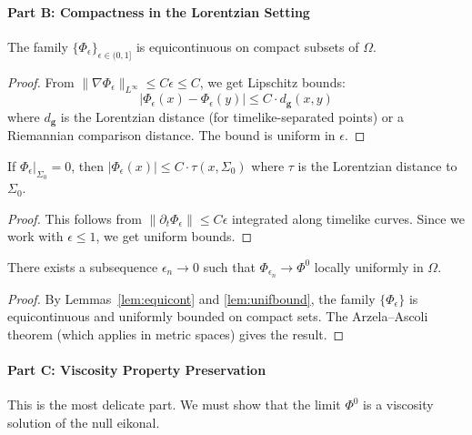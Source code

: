 \paragraph{Part B: Compactness in the Lorentzian Setting}

\begin{lemma}[Equicontinuity]\label{lem:equicont}
The family $\{\Phi_\epsilon\}_{\epsilon \in (0,1]}$ is equicontinuous on compact subsets of $\Omega$.
\end{lemma}

\begin{proof}
From $\|\nabla\Phi_\epsilon\|_{L^\infty} \leq C\epsilon \leq C$, we get Lipschitz bounds:
\[
|\Phi_\epsilon(x) - \Phi_\epsilon(y)| \leq C \cdot d_{\mathbf{g}}(x, y)
\]
where $d_{\mathbf{g}}$ is the Lorentzian distance (for timelike-separated points) or a Riemannian comparison distance. The bound is uniform in $\epsilon$.
\end{proof}

\begin{lemma}\label{lem:unifbound}
If $\Phi_\epsilon|_{\Sigma_0} = 0$, then $|\Phi_\epsilon(x)| \leq C \cdot \tau(x, \Sigma_0)$ where $\tau$ is the Lorentzian distance to $\Sigma_0$.
\end{lemma}

\begin{proof}
This follows from $\|\partial_t\Phi_\epsilon\| \leq C\epsilon$ integrated along timelike curves. Since we work with $\epsilon \leq 1$, we get uniform bounds.
\end{proof}

\begin{theorem}\label{thm:AAcompact}
There exists a subsequence $\epsilon_n \to 0$ such that $\Phi_{\epsilon_n} \to \Phi^0$ locally uniformly in $\Omega$.
\end{theorem}

\begin{proof}
By Lemmas~\ref{lem:equicont} and \ref{lem:unifbound}, the family $\{\Phi_\epsilon\}$ is equicontinuous and uniformly bounded on compact sets. The Arzela--Ascoli theorem (which applies in metric spaces) gives the result.
\end{proof}

\paragraph{Part C: Viscosity Property Preservation}

This is the most delicate part. We must show that the limit $\Phi^0$ is a viscosity solution of the null eikonal.

